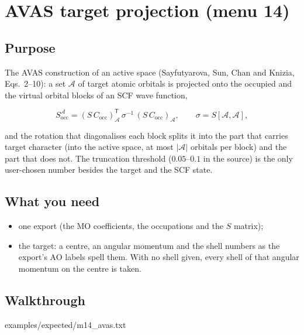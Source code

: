 \chapter{AVAS target projection (menu 14)}
\label{ch:menu14}

\section{Purpose}

The AVAS construction of an active space (Sayfutyarova, Sun, Chan and Knizia,
Eqs.~2--10): a set $\mathcal{A}$ of target atomic orbitals is projected onto the
occupied and the virtual orbital blocks of an SCF wave function,

\begin{equation}
S^{\mathcal{A}}_{\mathrm{occ}} = (S\,C_{\mathrm{occ}})_{\mathcal{A}}^{\mathsf{T}}
  \,\sigma^{-1}\,(S\,C_{\mathrm{occ}})_{\mathcal{A}},
\qquad \sigma = S[\mathcal{A},\mathcal{A}],
\label{eq:avas}
\end{equation}

and the rotation that diagonalises each block splits it into the part that
carries target character (into the active space, at most $|\mathcal{A}|$
orbitals per block) and the part that does not. The truncation threshold
($0.05$--$0.1$ in the source) is the only user-chosen number besides the target
and the SCF state.

\section{What you need}

\begin{itemize}
  \item one  export (the MO coefficients, the occupations and
    the $S$ matrix);
  \item the target: a centre, an angular momentum and the shell numbers as the
    export's AO labels spell them. With no shell given, every shell of that
    angular momentum on the centre is taken.
\end{itemize}

\section{Walkthrough}


  {examples/expected/m14_avas.txt}

